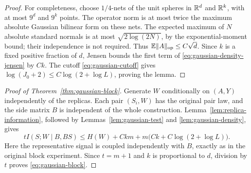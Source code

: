 \begin{proof}
For completeness, choose $1/4$-nets of the unit spheres in $\mathbb R^d$ and
$\mathbb R^k$, with at most $9^d$ and $9^k$ points. The operator norm is at most
twice the maximum absolute Gaussian bilinear form on these nets. The
expected maximum of $N$ absolute standard normals is at most
$\sqrt{2\log(2N)}$, by the exponential-moment bound; their independence is
not required. Thus $\mathbb E\lVert A\rVert_{\mathrm{op}}\le C\sqrt d$. Since $k$ is a fixed
positive fraction of $d$, Jensen bounds the first term of
\eqref{eq:gaussian-density-jensen} by $Ck$. The cutoff
\eqref{eq:gaussian-cutoff} gives
$\log(J_0+2)\le C\log(2+\log L)$, proving the lemma.
\end{proof}

\begin{proof}[Proof of Theorem~\ref{thm:gaussian-block}]
Generate $W$ conditionally on $(A,Y)$ independently of the replicas.
Each pair $(S_i,W)$ has the original pair law, and the side matrix $B$ is
independent of the whole construction. Lemma~\ref{lem:replica-information},
followed by Lemmas~\ref{lem:gaussian-test} and
\ref{lem:gaussian-density}, gives
\[
 tI(S;W\mid B,BS)
 \le H(W)+Ckm+m\bigl(Ck+C\log(2+\log L)\bigr).
\]
Here the representative signal is coupled independently with $B$, exactly
as in the original block experiment. Since $t=m+1$ and $k$ is proportional
to $d$, division by $t$ proves \eqref{eq:gaussian-block}.
\end{proof}

